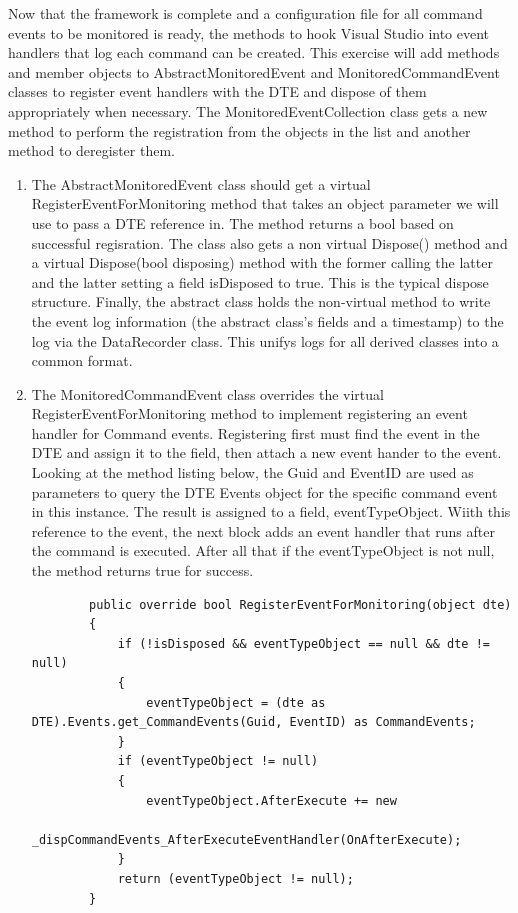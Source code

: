 \newpage




\begin{Exercise}


Now that the framework is complete and a configuration file for all command events to be monitored is ready, the methods to hook Visual Studio into event handlers that log each command can be created.  This exercise will add methods and member objects to AbstractMonitoredEvent and MonitoredCommandEvent classes to register event handlers with the DTE and dispose of them appropriately when necessary.  The MonitoredEventCollection class gets a new method to perform the registration from the objects in the list and another method to deregister them.

\begin{enumerate}
\item
The AbstractMonitoredEvent class should get a virtual RegisterEventForMonitoring method that takes an object parameter we will use to pass a DTE reference in.  The method returns a bool based on successful regisration.  The class also gets a non virtual Dispose() method  and a virtual Dispose(bool disposing) method with the former calling the latter and the latter setting a field isDisposed to true. This is the typical dispose structure.  Finally, the abstract class holds the non-virtual method to write the event log information (the abstract class's fields and a timestamp) to the log via the DataRecorder class.  This unifys logs for all derived classes into a common format.

\item
The MonitoredCommandEvent class overrides the virtual RegisterEventForMonitoring method to implement registering an event handler for Command events.  Registering first must find the event in the DTE and assign it to the field, then attach a new event hander to the event.  Looking at the method listing below, the Guid and EventID are used as parameters to query the DTE Events object for the specific command event in this instance.  The result is assigned to a field, eventTypeObject.  Wiith this reference to the event, the next block adds an event handler that runs after the command is executed.  After all that if the eventTypeObject is not null, the method returns true for success.
\begin{lstlisting}
        public override bool RegisterEventForMonitoring(object dte)
        {
            if (!isDisposed && eventTypeObject == null && dte != null)
            {
                eventTypeObject = (dte as DTE).Events.get_CommandEvents(Guid, EventID) as CommandEvents;
            }
            if (eventTypeObject != null)
            {
                eventTypeObject.AfterExecute += new 
			_dispCommandEvents_AfterExecuteEventHandler(OnAfterExecute);
            }
            return (eventTypeObject != null);
        }
\end{lstlisting}


\end{enumerate}
\end{Exercise}
